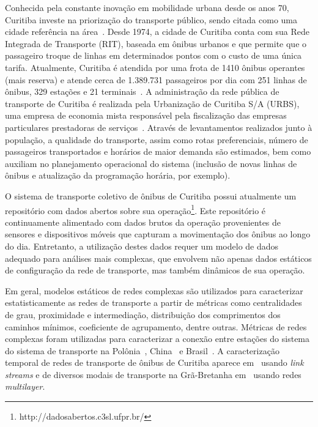 \textcolor{courb2020}{
Conhecida pela constante inovação em mobilidade urbana desde os anos 70, Curitiba investe na priorização do transporte público, sendo citada como uma cidade referência na área~\cite{CWBconhecida}. Desde 1974, a cidade de Curitiba conta com sua Rede Integrada de Transporte (RIT), baseada em ônibus urbanos e que permite que o passageiro troque de linhas em determinados pontos com o custo de uma única tarifa. Atualmente, Curitiba é atendida por uma frota de 1410 ônibus operantes (mais reserva) e atende cerca de 1.389.731 passageiros por dia com 251 linhas de ônibus, 329 estações e 21 terminais~\cite{Cur:19}. 
A administração da rede pública de transporte de Curitiba é realizada pela Urbanização de Curitiba S/A (URBS), uma empresa de economia mista responsável pela fiscalização das empresas particulares prestadoras de serviços~\cite{URBS}. Através de levantamentos realizados junto à população, a qualidade do transporte, assim como rotas preferenciais, número de passageiros transportados e horários de maior demanda são estimados, bem como auxiliam no planejamento operacional do sistema (inclusão de novas linhas de ônibus e atualização da programação horária, por exemplo).
}

\textcolor{courb2020}{
O sistema de transporte coletivo de ônibus de Curitiba possui atualmente um repositório com dados abertos sobre sua operação\footnote{http://dadosabertos.c3sl.ufpr.br/}. Este repositório é continuamente alimentado com dados brutos da operação provenientes de sensores e dispositivos móveis que capturam a movimentação dos ônibus ao longo do dia. Entretanto, a utilização destes dados requer um modelo de dados adequado para análises mais complexas, que envolvem não apenas dados estáticos de configuração da rede de transporte, mas também dinâmicos de sua operação.
}

\textcolor{courb2020}{
Em geral, modelos estáticos de redes complexas são utilizados para caracterizar estatisticamente as redes de transporte a partir de métricas como centralidades de grau, proximidade e intermediação, distribuição dos comprimentos dos caminhos mínimos, coeficiente de agrupamento, dentre outras. Métricas de redes complexas foram utilizadas para caracterizar a conexão entre estações do sistema do sistema de transporte na Polônia~\cite{Sienkiewicz2005}, China~\cite{Xu2013} e Brasil~\cite{Izawa2017}. A caracterização temporal de redes de transporte de ônibus de Curitiba aparece em~\cite{curz:19} usando \emph{link streams} e de diversos modais de transporte na Grã-Bretanha em~\cite{Gallotti2015} usando redes \emph{multilayer}.
}

